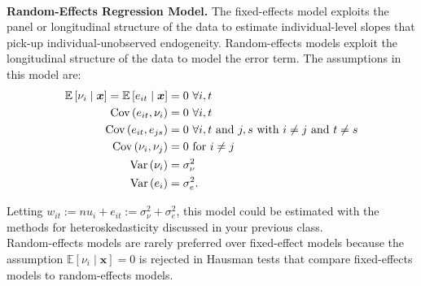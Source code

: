 \

\noindent \textbf{Random-Effects Regression Model.} The fixed-effects model exploits the panel or longitudinal structure of the data to estimate individual-level slopes that pick-up individual-unobserved endogeneity. Random-effects models exploit the longitudinal structure of the data to model the error term. The assumptions in this model are: 
\begin{align}
	\mathbb{E} \left[ \nu_i \mid \bm{x} \right] = \mathbb{E} \left[ e_{it} \mid \bm{x} \right] & =  0 \ \forall i,t \nonumber \\ 
	\operatorname{Cov} \left( e_{it}, \nu_i \right) & = 0 \ \forall i,t \nonumber \\ 
	\operatorname{Cov} \left( e_{it}, e_{js} \right) & = 0 \ \forall i,t \text{ and } j,s \text{ with } i \neq j \text{ and } t \neq s \nonumber \\ 
	\operatorname{Cov} \left( \nu_i , \nu_j \right) & = 0 \text{ for } i \neq j \nonumber \\
	\operatorname{Var} \left( \nu_i \right) & = \sigma_\nu^2 \nonumber \\ 
	\operatorname{Var} \left( e_i \right) & = \sigma_e^2.
\end{align}

\noindent Letting $w_{it}:= nu_i + e_{it} :=  \sigma_\nu^2 + \sigma_e^2 $, this model could be estimated with the methods for heteroskedasticity discussed in your previous class.\\

\noindent Random-effects models are rarely preferred over fixed-effect models because the assumption $\mathbb{E} \left[ \nu_i \mid \bm{x} \right] = 0$ is rejected in Hausman tests that compare fixed-effects models to random-effects models. 



